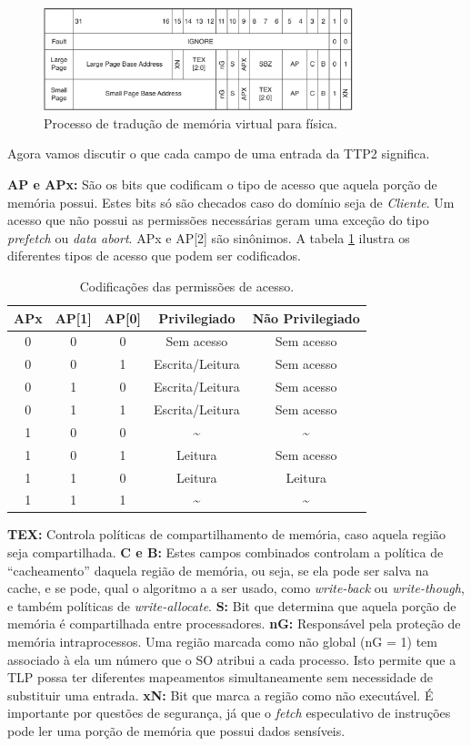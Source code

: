 \begin{figure}[h]
    \centering
    \includegraphics[width=9cm]{figuras/l2_entry}
    \caption{Processo de tradução de memória virtual para física.}
    \label{fig:l2_entry}
\end{figure}

Agora vamos discutir o que cada campo de uma entrada da TTP2 significa.

\textbf{AP e APx:} São os bits que codificam o tipo de acesso que aquela porção de memória possui. Estes bits só são checados caso do domínio seja de \emph{Cliente}. Um acesso que não possui as permissões necessárias geram uma exceção do tipo \emph{prefetch} ou \emph{data abort}. APx e AP[2] são sinônimos. A tabela \ref{tab:apx} ilustra os diferentes tipos de acesso que podem ser codificados.

\begin{table}[h]
	\centering
	\begin{tabular}{ccccc}
		\hline \hline
		APx & AP[1] & AP[0] & Privilegiado & Não Privilegiado\\[0.5ex]
		\hline
		0 & 0 & 0 & Sem acesso & Sem acesso\\
		0 & 0 & 1 & Escrita/Leitura & Sem acesso\\
		0 & 1 & 0 & Escrita/Leitura & Sem acesso\\
		0 & 1 & 1 & Escrita/Leitura & Sem acesso\\
		1 & 0 & 0 & \~{} 			& \~{}		 \\
		1 & 0 & 1 & Leitura 		& Sem acesso \\
		1 & 1 & 0 & Leitura 		& Leitura	 \\
		1 & 1 & 1 & \~{} 			& \~{}		 \\[1ex]
		\hline
	\end{tabular}
	\caption{Codificações das permissões de acesso.}
	\label{tab:apx}
\end{table}


\textbf{TEX:} Controla políticas de compartilhamento de memória, caso aquela região seja compartilhada.
\textbf{C e B:} Estes campos combinados controlam a política de ``cacheamento'' daquela região de memória, ou seja, se ela pode ser salva na cache, e se pode, qual o algoritmo a a ser usado, como \emph{write-back} ou \emph{write-though}, e também políticas de \emph{write-allocate}.
\textbf{S:} Bit que determina que aquela porção de memória é compartilhada entre processadores.
\textbf{nG:} Responsável pela proteção de memória intraprocessos. Uma região marcada como não global (nG = 1) tem associado à ela um número que o SO atribui a cada processo. Isto permite que a TLP possa ter diferentes mapeamentos simultaneamente sem necessidade de substituir uma entrada.
\textbf{xN:} Bit que marca a região como não executável. É importante por questões de segurança, já que o \emph{fetch} especulativo de instruções pode ler uma porção de memória que possui dados sensíveis.


